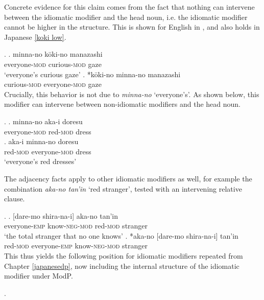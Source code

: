 \documentclass [output=book,colorlinks,citecolor=brown]{langscibook}
\begin{document}
Concrete evidence for this claim comes from the fact that nothing can intervene between the idiomatic modifier and the head noun, i.e. the idiomatic modifier cannot be higher in the structure. This is shown for English in \citet[36–37]{svenonius:2008:position}, and also holds in Japanese \ref{koki low}. %

\ex. \label{koki low} \ag. minna-no kōki-no manazashi\\
everyone-\textsc{mod} curious-\textsc{mod} gaze\\
`everyone's curious gaze'
\bg. *kōki-no minna-no manazashi\\
curious-\textsc{mod} everyone-\textsc{mod} gaze\\

Crucially, this behavior is not due to \textit{minna-no} `everyone’s’. As shown below, this modifier can intervene between non-idiomatic modifiers and the head noun.

\ex. \ag. minna-no aka-i doresu\\
everyone-\textsc{mod} red-\textsc{mod} dress\\
\bg. aka-i minna-no doresu\\
red-\textsc{mod} everyone-\textsc{mod} dress\\
`everyone's red dresses'

The adjacency facts apply to other idiomatic modifiers as well, for example the combination \textit{aka-no tan'in} `red stranger', tested with an intervening relative clause.


\ex. \ag. [dare-mo shira-na-i] aka-no tan'in\\
everyone-\textsc{emp} know-\textsc{neg}-\textsc{mod} red-\textsc{mod} stranger\\
`the total stranger that no one knows'
\bg. *aka-no [dare-mo shira-na-i] tan'in\\
red-\textsc{mod} everyone-\textsc{emp} know-\textsc{neg-mod} stranger\\

This thus yields the following position for idiomatic modifiers repeated from Chapter \ref{japanesedp}, now including the internal structure of the idiomatic modifier under ModP.

\newpage

\ex. 
\end{document}
